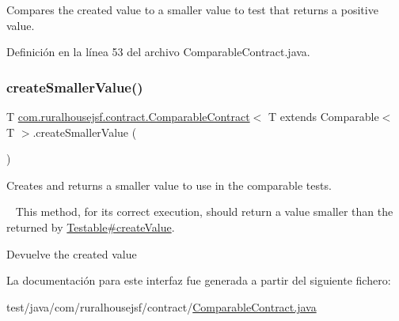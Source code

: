 Compares the created value to a smaller value to test that returns a positive value. 



Definición en la línea 53 del archivo Comparable\+Contract.\+java.

\mbox{\label{a00236_a63e1e8c46f202f132c7f15b51a11ee27}} 
\subsubsection{\texorpdfstring{createSmallerValue()}{createSmallerValue()}}
{\footnotesize\ttfamily T \mbox{\hyperlink{a00236}{com.\+ruralhousejsf.\+contract.\+Comparable\+Contract}}$<$ T extends Comparable$<$ T $>$.create\+Smaller\+Value (\begin{DoxyParamCaption}{ }\end{DoxyParamCaption})}



Creates and returns a smaller value to use in the comparable tests. 

~\newline
 This method, for its correct execution, should return a value smaller than the returned by \mbox{\hyperlink{a00244_ae4546a381488faaba1ef7c0f8688de9c}{Testable\#create\+Value}}.

\begin{DoxyReturn}{Devuelve}
the created value 
\end{DoxyReturn}


La documentación para este interfaz fue generada a partir del siguiente fichero\+:\begin{DoxyCompactItemize}
\item 
test/java/com/ruralhousejsf/contract/\mbox{\hyperlink{a00083}{Comparable\+Contract.\+java}}\end{DoxyCompactItemize}
